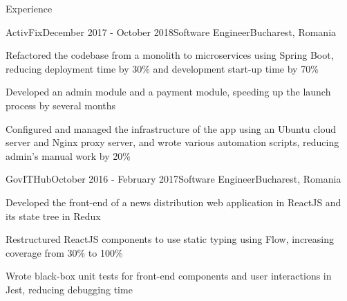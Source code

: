 \documentclass{resume} %
\begin{document}
\begin{rSection}{Experience}

\begin{rSubsection}{ActivFix}{December 2017 - October 2018}{Software Engineer}{Bucharest, Romania}
\item Refactored the codebase from a monolith to microservices using Spring Boot, reducing deployment time by 30\% and development start-up time by 70\%
\item Developed an admin module and a payment module, speeding up the launch process by several months
\item Configured and managed the infrastructure of the app using an Ubuntu cloud server and Nginx proxy server,  and wrote various automation scripts, reducing admin's manual work by 20\%
\end{rSubsection}


\begin{rSubsection}{GovITHub}{October 2016 - February 2017}{Software Engineer}{Bucharest, Romania}
\item Developed the front-end of a news distribution web application in ReactJS and its state tree in Redux
\item Restructured ReactJS components to use static typing using Flow, increasing coverage from 30\% to 100\%
\item Wrote black-box unit tests for front-end components and user interactions in Jest, reducing debugging time
\end{rSubsection}

\end{rSection}

\end{document}
